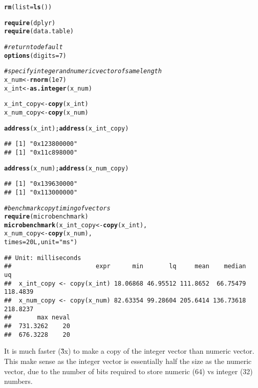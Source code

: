 \documentclass{article}\usepackage[]{graphicx}\usepackage[]{color}
\makeatletter
\newcommand{\hlnum}[1]{\textcolor[rgb]{0.686,0.059,0.569}{#1}}%
\newcommand{\hlstr}[1]{\textcolor[rgb]{0.192,0.494,0.8}{#1}}%
\newcommand{\hlcom}[1]{\textcolor[rgb]{0.678,0.584,0.686}{\textit{#1}}}%
\newcommand{\hlstd}[1]{\textcolor[rgb]{0.345,0.345,0.345}{#1}}%
\newcommand{\hlkwb}[1]{\textcolor[rgb]{0.69,0.353,0.396}{#1}}%
\newcommand{\hlkwc}[1]{\textcolor[rgb]{0.333,0.667,0.333}{#1}}%
\newcommand{\hlkwd}[1]{\textcolor[rgb]{0.737,0.353,0.396}{\textbf{#1}}}%
\newenvironment{kframe}{%
 \def\at@end@of@kframe{}%
 \ifinner\ifhmode%
  \def\at@end@of@kframe{\end{minipage}}%
  \begin{minipage}{\columnwidth}%
 \fi\fi%
 \def\FrameCommand##1{\hskip\@totalleftmargin \hskip-\fboxsep
 \colorbox{shadecolor}{##1}\hskip-\fboxsep
     \hskip-\linewidth \hskip-\@totalleftmargin \hskip\columnwidth}%
 \MakeFramed {\advance\hsize-\width
   \@totalleftmargin\z@ \linewidth\hsize
   \@setminipage}}%
 {\par\unskip\endMakeFramed%
 \at@end@of@kframe}
\newenvironment{knitrout}{}{} %
\makeatother
\begin{document}
\begin{knitrout}
\color{fgcolor}\begin{kframe}
\begin{alltt}
\hlkwd{rm}\hlstd{(}\hlkwc{list}\hlstd{=}\hlkwd{ls}\hlstd{())}

\hlkwd{require}\hlstd{(dplyr)}
\hlkwd{require}\hlstd{(data.table)}

\hlcom{#return to default}
\hlkwd{options}\hlstd{(}\hlkwc{digits} \hlstd{=} \hlnum{7}\hlstd{)}

\hlcom{#specify integer and numeric vector of same length}
\hlstd{x_num} \hlkwb{<-} \hlkwd{rnorm}\hlstd{(}\hlnum{1e7}\hlstd{)}
\hlstd{x_int} \hlkwb{<-} \hlkwd{as.integer}\hlstd{(x_num)}

\hlstd{x_int_copy} \hlkwb{<-} \hlkwd{copy}\hlstd{(x_int)}
\hlstd{x_num_copy} \hlkwb{<-} \hlkwd{copy}\hlstd{(x_num)}

\hlkwd{address}\hlstd{(x_int);} \hlkwd{address}\hlstd{(x_int_copy)}
\end{alltt}
\begin{verbatim}
## [1] "0x123800000"
## [1] "0x11c898000"
\end{verbatim}
\begin{alltt}
\hlkwd{address}\hlstd{(x_num);} \hlkwd{address}\hlstd{(x_num_copy)}
\end{alltt}
\begin{verbatim}
## [1] "0x139630000"
## [1] "0x113000000"
\end{verbatim}
\begin{alltt}
\hlcom{#benchmark copy timing of vectors}
\hlkwd{require}\hlstd{(microbenchmark)}
\hlkwd{microbenchmark}\hlstd{(x_int_copy} \hlkwb{<-} \hlkwd{copy}\hlstd{(x_int),}
               \hlstd{x_num_copy} \hlkwb{<-} \hlkwd{copy}\hlstd{(x_num),}
               \hlkwc{times} \hlstd{=} \hlnum{20L}\hlstd{,} \hlkwc{unit}\hlstd{=} \hlstr{"ms"}\hlstd{)}
\end{alltt}
\begin{verbatim}
## Unit: milliseconds
##                       expr      min       lq     mean    median       uq
##  x_int_copy <- copy(x_int) 18.06868 46.95512 111.8652  66.75479 118.4839
##  x_num_copy <- copy(x_num) 82.63354 99.28604 205.6414 136.73618 218.8237
##       max neval
##  731.3262    20
##  676.3228    20
\end{verbatim}
\end{kframe}
\end{knitrout}
It is much faster (\~3x) to make a copy of the integer vector than numeric vector. This make sense as the integer vector is essentially half the size as the numeric vector, due to the number of bits required to store numeric (64) vs integer (32) numbers.
\end{document}
